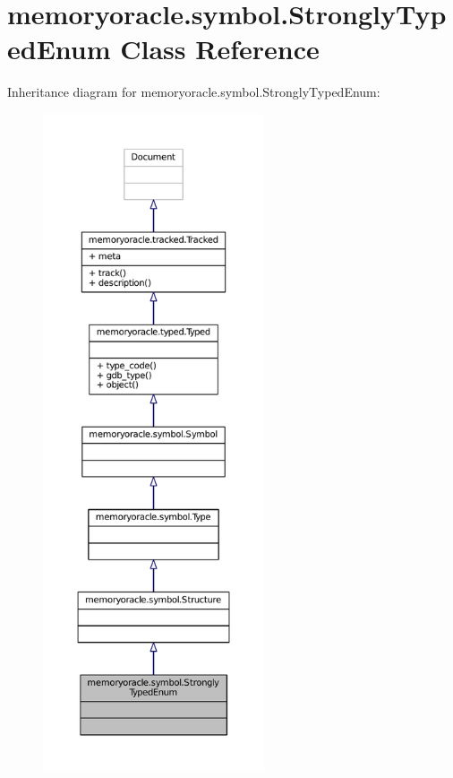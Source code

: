 \hypertarget{classmemoryoracle_1_1symbol_1_1StronglyTypedEnum}{}\section{memoryoracle.\+symbol.\+Strongly\+Typed\+Enum Class Reference}
\label{classmemoryoracle_1_1symbol_1_1StronglyTypedEnum}


Inheritance diagram for memoryoracle.\+symbol.\+Strongly\+Typed\+Enum\+:
\nopagebreak
\begin{figure}[H]
\begin{center}
\leavevmode
\includegraphics[height=550pt]{classmemoryoracle_1_1symbol_1_1StronglyTypedEnum__inherit__graph}
\end{center}
\end{figure}


